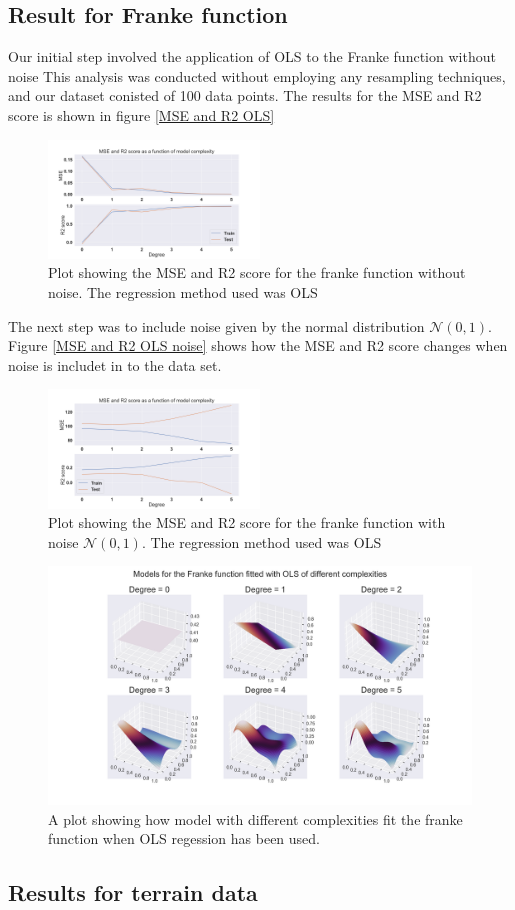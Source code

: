 \thispagestyle{plain}
\subsection{Result for Franke function}
\noindent Our initial step involved the application of OLS to the Franke function without noise
This analysis was conducted without employing any resampling techniques, 
and our dataset conisted of 100 data points. The results for the MSE and R2 score is shown in 
figure \eqref{MSE and R2 OLS}

\begin{figure}[h]
	\centering
	\includegraphics[width=0.5\textwidth]{Figure_3.png}
	\caption{Plot showing the MSE and R2 score for the franke function without noise. The regression method used was OLS}
	\label{MSE and R2 OLS}
\end{figure}
\noindent The next step was to include noise given by the normal distribution $\mathcal{N}(0,1)$. Figure \eqref{MSE and R2 OLS noise} shows
how the MSE and R2 score changes when noise is includet in to the data set.
\begin{figure}[h]
	\centering
	\includegraphics[width=0.5\textwidth]{Figure_4.png}
	\caption{Plot showing the MSE and R2 score for the franke function with noise $\mathcal{N}(0,1)$. The regression method used was OLS}
	\label{MSE and R2 OLS noise}
\end{figure}
\begin{figure}[h]
	\centering
	\includegraphics[width=\textwidth]{Figure_2.png}
	\caption{A plot showing how model with different complexities fit the franke function when OLS regession has been used.}
	\label{OLS figure}
\end{figure}


\subsection{Results for terrain data}
